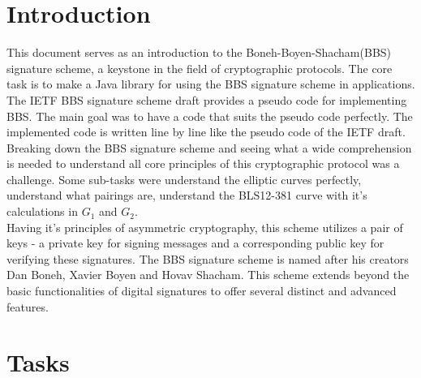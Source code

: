 \documentclass{article}
\begin{document}
\section{Introduction}
This document serves as an introduction to the Boneh-Boyen-Shacham(BBS) signature scheme, a keystone in the field of cryptographic protocols. The core task is to make a Java library for using the BBS signature scheme in applications. The \gls{IETF} BBS signature scheme draft \cite{bbs-signature-identity} provides a pseudo code for implementing \gls{BBS}. The main goal was to have a code that suits the pseudo code perfectly. The implemented code is written line by line like the pseudo code of the \gls{IETF} draft. Breaking down the BBS signature scheme and seeing what a wide comprehension is needed to understand all core principles of this cryptographic protocol was a challenge. Some sub-tasks were understand the elliptic curves perfectly, understand what pairings are, understand the BLS12-381 curve with it's calculations in \(G_1\) and \(G_2\). \\
Having it's principles of asymmetric cryptography, this scheme utilizes a pair of keys - a private key for signing messages and a corresponding public key for verifying these signatures. The BBS signature scheme is named after his creators Dan Boneh, Xavier Boyen and Hovav Shacham. This scheme extends beyond the basic functionalities of digital signatures to offer several distinct and advanced features. \cite{bbs-signature-identity}

\section{Tasks}
\end{document}

